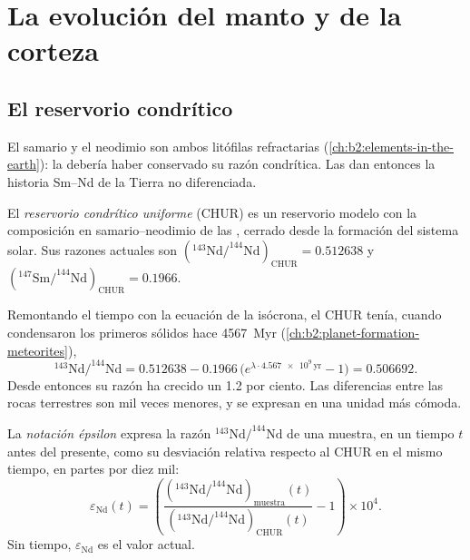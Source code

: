 \section{La evolución del manto y de la corteza}

\subsection{El reservorio condrítico}

El samario y el neodimio son ambos  litófilas refractarias
(\cref{ch:b2:elements-in-the-earth}): la  debería haber conservado
su razón condrítica. Las  dan entonces la historia Sm--Nd de la
Tierra no diferenciada.

\begin{definition}\label{def:b2:isotope-geochemistry:chur}
El \emph{reservorio condrítico uniforme}
(CHUR) es un reservorio modelo con la composición en samario--neodimio de las
, cerrado desde la formación del sistema solar. Sus razones
actuales son $(^{143}\mathrm{Nd}/^{144}\mathrm{Nd})_{\mathrm{CHUR}} = 0.512638$ y
$(^{147}\mathrm{Sm}/^{144}\mathrm{Nd})_{\mathrm{CHUR}} = 0.1966$.
\end{definition}

Remontando el tiempo con la ecuación de la isócrona, el CHUR tenía, cuando condensaron los primeros
sólidos hace \qty{4567}{Myr} (\cref{ch:b2:planet-formation-meteorites}),
\[
  ^{143}\mathrm{Nd}/^{144}\mathrm{Nd} = 0.512638 - 0.1966\,\bigl(e^{\lambda\cdot
  \num{4.567e9}\,\mathrm{yr}}-1\bigr) = 0.506692 .
\] Desde entonces su razón ha crecido un
1.2 por ciento. Las diferencias entre las rocas terrestres son mil veces
menores, y se expresan en una unidad más cómoda.

\begin{definition}\label{def:b2:isotope-geochemistry:epsilon}
La \emph{notación épsilon} expresa la razón
$^{143}\mathrm{Nd}/^{144}\mathrm{Nd}$ de una muestra, en un tiempo $t$ antes del
presente, como su desviación relativa respecto al CHUR en el mismo tiempo, en partes por diez
mil:
\[
  \varepsilon_{\mathrm{Nd}}(t) = \left(
  \frac{(^{143}\mathrm{Nd}/^{144}\mathrm{Nd})_{\text{muestra}}(t)}
       {(^{143}\mathrm{Nd}/^{144}\mathrm{Nd})_{\mathrm{CHUR}}(t)} - 1\right)\times 10^4 .
\]
Sin tiempo, $\varepsilon_{\mathrm{Nd}}$ es el valor actual.
\end{definition}

